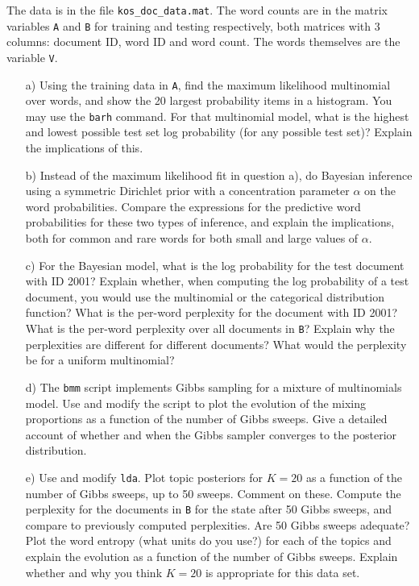 \documentclass[12pt]{article}
\begin{document}
The data is in the file \texttt{kos\_doc\_data.mat}. The word counts
are in the matrix variables \texttt{A} and \texttt{B} for training and
testing respectively, both matrices with 3 columns: document ID, word
ID and word count. The words themselves are the variable \texttt{V}. 
%
\begin{enumerate}

\item[a)] Using the training data in \texttt{A}, find the maximum
  likelihood multinomial over words, and show the 20 largest
  probability items in a histogram. You may use the \texttt{barh}
  command. For that multinomial model, what is the highest and lowest
  possible test set log probability (for any possible test set)?
  Explain the implications of this.

\item[b)] Instead of the maximum likelihood fit in question a), do
  Bayesian inference using a symmetric Dirichlet prior with a
  concentration parameter $\alpha$ on the word probabilities.  Compare
  the expressions for the predictive word probabilities for these two
  types of inference, and explain the implications, both for common
  and rare words for both small and large values of $\alpha$.

\item[c)] For the Bayesian model, what is the log probability for the
  test document with ID 2001? Explain whether, when computing the log
  probability of a test document, you would use the multinomial or the
  categorical distribution function? What is the per-word perplexity
  for the document with ID 2001? What is the per-word perplexity over
  all documents in \texttt{B}? Explain why the perplexities are
  different for different documents? What would the perplexity be for
  a uniform multinomial?

\item[d)] The \texttt{bmm} script implements Gibbs sampling for a
  mixture of multinomials model. Use and modify the script to plot the
  evolution of the mixing proportions as a function of the number of
  Gibbs sweeps. Give a detailed account of whether and when the Gibbs
  sampler converges to the posterior distribution.

\item[e)] Use and modify \texttt{lda}. Plot topic posteriors for
  $K=20$ as a function of the number of Gibbs sweeps, up to 50
  sweeps. Comment on these. Compute the perplexity for the documents
  in \texttt{B} for the state after 50 Gibbs sweeps, and compare to
  previously computed perplexities. Are 50 Gibbs sweeps adequate?
  Plot the word entropy (what units do you use?) for each of the
  topics and explain the evolution as a function of the number of
  Gibbs sweeps. Explain whether and why you think $K=20$ is appropriate for
  this data set.
\end{enumerate}
\end{document}
